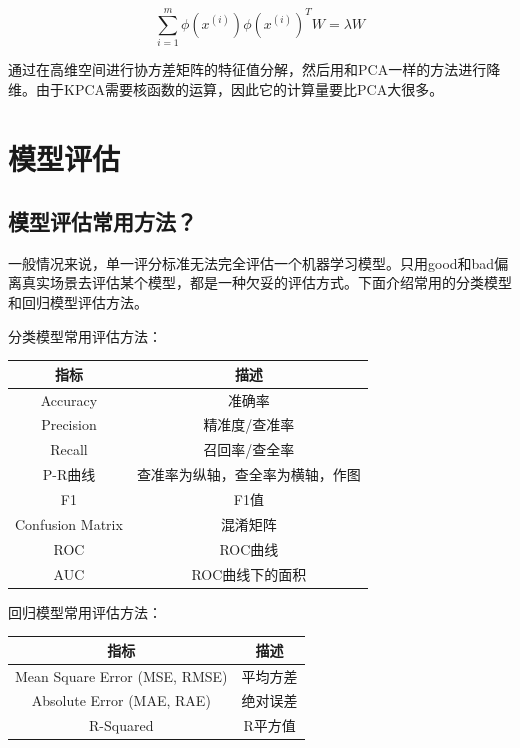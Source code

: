 $$
\sum^m_{i=1} \phi \left( x^{(i)} \right) \phi \left( x^{(i)} \right)^T W = \lambda W
$$

通过在高维空间进行协方差矩阵的特征值分解，然后用和PCA一样的方法进行降维。由于KPCA需要核函数的运算，因此它的计算量要比PCA大很多。

\section{模型评估}

\subsection{模型评估常用方法？}

一般情况来说，单一评分标准无法完全评估一个机器学习模型。只用good和bad偏离真实场景去评估某个模型，都是一种欠妥的评估方式。下面介绍常用的分类模型和回归模型评估方法。

分类模型常用评估方法：

\begin{table}[h]
	\centering
	\begin{tabular}{|c|c|}\hline
		指标 & 描述 \\\hline
		Accuracy & 准确率 \\\hline
		Precision & 精准度/查准率 \\\hline
		Recall & 召回率/查全率 \\\hline
		P-R曲线 & 查准率为纵轴，查全率为横轴，作图 \\\hline
		F1 & F1值 \\\hline
		Confusion Matrix & 混淆矩阵 \\\hline
		ROC & ROC曲线 \\\hline
		AUC & ROC曲线下的面积 \\\hline
	\end{tabular}
\end{table}


回归模型常用评估方法：

\begin{table}[h]
	\centering
	\begin{tabular}{|c|c|}\hline
		指标 & 描述 \\\hline
		Mean Square Error (MSE, RMSE) & 平均方差 \\\hline
		Absolute Error (MAE, RAE) & 绝对误差 \\\hline
		R-Squared & R平方值 \\\hline
	\end{tabular}
\end{table}

